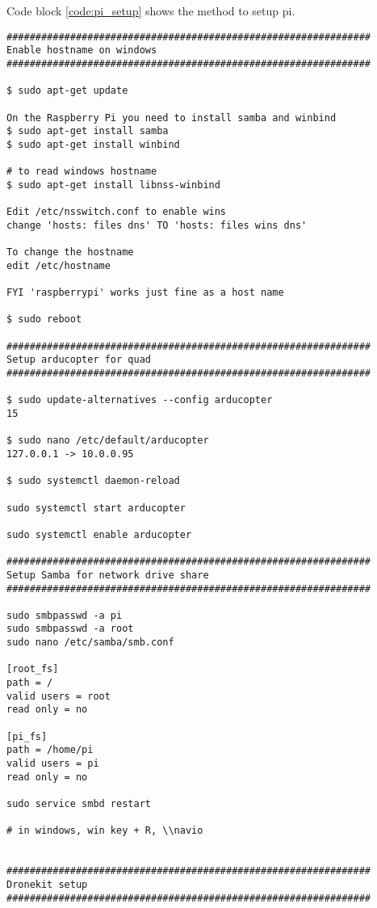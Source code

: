 \begin{appendices}
\begin{lstlisting}
\end{lstlisting}

Code block \ref{code:pi_setup} shows the method to setup pi.

\begin{lstlisting}
###############################################################
Enable hostname on windows
###############################################################

$ sudo apt-get update

On the Raspberry Pi you need to install samba and winbind
$ sudo apt-get install samba
$ sudo apt-get install winbind

# to read windows hostname
$ sudo apt-get install libnss-winbind

Edit /etc/nsswitch.conf to enable wins
change 'hosts: files dns' TO 'hosts: files wins dns'

To change the hostname
edit /etc/hostname

FYI 'raspberrypi' works just fine as a host name

$ sudo reboot

###############################################################
Setup arducopter for quad
###############################################################

$ sudo update-alternatives --config arducopter
15

$ sudo nano /etc/default/arducopter 
127.0.0.1 -> 10.0.0.95

$ sudo systemctl daemon-reload

sudo systemctl start arducopter

sudo systemctl enable arducopter

###############################################################
Setup Samba for network drive share
###############################################################

sudo smbpasswd -a pi
sudo smbpasswd -a root
sudo nano /etc/samba/smb.conf

[root_fs]
path = /
valid users = root
read only = no

[pi_fs]
path = /home/pi
valid users = pi
read only = no

sudo service smbd restart

# in windows, win key + R, \\navio


###############################################################
Dronekit setup
###############################################################


\end{lstlisting}
\end{appendices}
